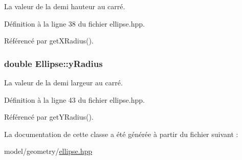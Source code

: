 La valeur de la demi hauteur au carré. 



Définition à la ligne 38 du fichier ellipse.\+hpp.



Référencé par get\+X\+Radius().

\hypertarget{classEllipse_a83614d1aaa446b1f8e404b6bc3cc8c19}{}
\subsubsection[{y\+Radius}]{\setlength{\rightskip}{0pt plus 5cm}double Ellipse\+::y\+Radius\hspace{0.3cm}{\ttfamily [protected]}}\label{classEllipse_a83614d1aaa446b1f8e404b6bc3cc8c19}


La valeur de la demi largeur au carré. 



Définition à la ligne 43 du fichier ellipse.\+hpp.



Référencé par get\+Y\+Radius().



La documentation de cette classe a été générée à partir du fichier suivant \+:\begin{DoxyCompactItemize}
\item 
model/geometry/\hyperlink{ellipse_8hpp}{ellipse.\+hpp}\end{DoxyCompactItemize}

